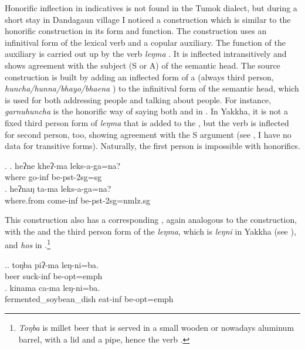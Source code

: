Honorific inflection in indicatives is not found in the Tumok dialect, but during a short stay in Dandagaun  village I noticed a  construction which is similar to the  honorific construction  in its form and function. The construction uses an infinitival form of the lexical verb and a copular auxiliary. The function of the auxiliary is carried out up by the verb \emph{leŋma} . It is inflected intransitively  and shows agreement with the subject (S or A) of the semantic head.  The  source construction is built by adding an inflected form of a  (always third person, \emph{huncha/hunna/bhayo/bhaena} ) to the infinitival form of the semantic head, which is used for both addressing people and talking about people. For instance, \emph{garnuhuncha} is the honorific way of saying both  and  in . In Yakkha, it is not a fixed third person form of \emph{leŋma} that is added to the , but the verb is inflected for second person, too, showing agreement with the S argument (see \Next, I have no data for transitive forms). Naturally, the first person is  impossible with honorifics. 

\ex. \ag. heʔne kheʔ-ma leks-a-ga=na?\\
where go-{\sc inf} be-{\sc pst-2sg=sg}\\
\bg. heʔnaŋ ta-ma leks-a-ga=na?\\
where.from come-{\sc inf} be-{\sc pst-2sg=nmlz.sg}\\
 
This construction also has a corresponding , again analogous to the  construction, with the  and the third person  form of the   \emph{leŋma}, which is  \emph{leŋni} in Yakkha (see \Next), and \emph{hos} in .\footnote{\emph{Toŋba} is millet beer that is served in a small wooden or nowadays aluminum barrel, with a lid and a pipe, hence the verb .}

\ex.\ag. toŋba piʔ-ma leŋ-ni=ba.\\
beer{\sc } suck-{\sc inf} be{\sc [3sg]-opt=emph}\\
\bg. kinama ca-ma leŋ-ni=ba.\\
fermented\_soybean\_dish eat-{\sc inf} be{\sc [3sg]-opt=emph}\\

